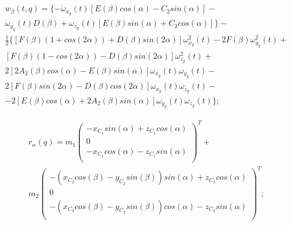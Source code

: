 \begin{equation}
\label{eq:p3:48+3}
\begin{multlined}
w_{ \beta } \left( t,q \right) = 
\lbrace 
- \dot \omega _{x_{y}} \left( t \right) \left[ E \left( \beta \right) cos \left( \alpha \right) -C_{2}^{}sin \left( \alpha \right) \right] -\\
\dot \omega _{y_{y}} \left( t \right) D \left( \beta \right) + \omega _{z_{y}} \left( t \right) \left[ E \left( \beta \right) sin \left( \alpha \right) +C_{2}cos \left( \alpha \right) \right] \rbrace -\\
\frac{1}{2} \lbrace \left[ F \left( \beta \right) \left( 1+cos \left( 2 \alpha \right) \right) +D \left( \beta \right) sin \left( 2 \alpha \right) \right] \omega _{x_{y}}^{2} \left( t \right) -2F \left( \beta \right) \omega _{y_{y}}^{2} \left( t \right) +\\
\left[ F \left( \beta \right) \left( 1-cos \left( 2 \alpha \right) \right) -D \left( \beta \right) sin \left( 2 \alpha \right) \right] \omega _{z_{y}}^{2} \left( t \right) +\\
2 \left[ 2A_{2} \left( \beta \right) cos \left( \alpha \right) -E \left( \beta \right) sin \left( \alpha \right) \right] \omega _{x_{y}} \left( t \right) \omega _{y_{y}} \left( t \right) -\\
2 \left[ F \left( \beta \right) sin \left( 2 \alpha \right) -D \left( \beta \right) cos \left( 2 \alpha \right) \right] \omega _{x_{y}} \left( t \right) \omega _{z_{y}} \left( t \right) -\\
-2 \left[ E \left( \beta \right) cos \left( \alpha \right) +2A_{2} \left( \beta \right) sin \left( \alpha \right) \right] \omega _{y_{y}} \left( t \right) \omega _{z_{y}} \left( t \right) \rbrace ;
\end{multlined}
\end{equation}


\begin{equation}
\label{eq:p3:48+4}
\begin{multlined}
r_{ \alpha } \left( q \right) =m_{1} \left( \begin{matrix}
-x_{C_{1}}sin \left( \alpha \right) +z_{C_{1}}cos \left( \alpha \right) \\
0\\
-x_{C_{1}}cos \left( \alpha \right) -z_{C_{1}}sin \left( \alpha \right) \\
\end{matrix}
\right) ^{T}+\\
m_{2} \left( \begin{matrix}
- \left( x_{C_{2}}cos \left( \beta \right) -y_{C_{2}}sin \left( \beta \right) \right) sin \left( \alpha \right) +z_{C_{2}}cos \left( \alpha \right) \\
0\\
- \left( x_{C_{2}}cos \left( \beta \right) -y_{C_{2}}sin \left( \beta \right) \right) cos \left( \alpha \right) -z_{C_{2}}sin \left( \alpha \right) \\
\end{matrix}
\right) ^{T};
\end{multlined}
\end{equation}

